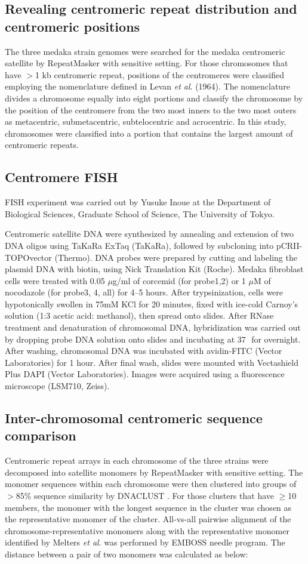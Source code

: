 \subsection*{Revealing centromeric repeat distribution and centromeric positions}
  The three medaka strain genomes were searched for the medaka centromeric satellite by RepeatMasker with sensitive setting. For those chromosomes that have $>$1 kb centromeric repeat, positions of the centromeres were classified employing the nomenclature defined in Levan \textit{et al}. (1964). The nomenclature divides a chromosome equally into eight portions and classify the chromosome by the position of the centromere from the two most inners to the two most outers as metacentric, submetacentric, subtelocentric and acrocentric. In this study, chromosomes were classified into a portion that contains the largest amount of centromeric repeats.


\subsection*{Centromere FISH}
  FISH experiment was carried out by Yusuke Inoue at the Department of Biological Sciences, Graduate School of Science, The University of Tokyo.

  Centromeric satellite DNA were synthesized by annealing and extension of two DNA oligos using TaKaRa ExTaq (TaKaRa), followed by subcloning into pCR\texttrademark II-TOPO\textregistered vector (Thermo). DNA probes were prepared by cutting and labeling the plasmid DNA with biotin, using Nick Translation Kit (Roche). Medaka fibroblast cells were treated with 0.05 $\mu$g/ml of corcemid (for probe1,2) or 1 $\mu$M of nocodazole (for probe3, 4, all) for 4--5 hours. After trypsinization, cells were hypotonically swollen in 75mM KCl for 20 minutes, fixed with ice-cold Carnoy's solution (1:3 acetic acid: methanol), then spread onto slides. After RNase treatment and denaturation of chromosomal DNA, hybridization was carried out by dropping probe DNA solution onto slides and incubating at 37\,\celsius\, for overnight. After washing, chromosomal DNA was incubated with avidin-FITC (Vector Laboratories) for 1 hour. After final wash, slides were mounted with Vectashield Plus DAPI (Vector Laboratories). Images were acquired using a fluorescence microscope (LSM710, Zeiss).


\subsection*{Inter-chromosomal centromeric sequence comparison}
  Centromeric repeat arrays in each chromosome of the three strains were decomposed into satellite monomers by RepeatMasker with sensitive setting. The monomer sequences within each chromosome were then clustered into groups of $>$85\% sequence similarity by DNACLUST \cite{Ghodsi2011}. For those clusters that have $\geq$10 members, the monomer with the longest sequence in the cluster was chosen as the representative monomer of the cluster. All-vs-all pairwise alignment of the chromosome-representative monomers along with the representative monomer identified by Melters \textit{et al}. was performed by EMBOSS needle program. The distance between a pair of two monomers was calculated as below:

